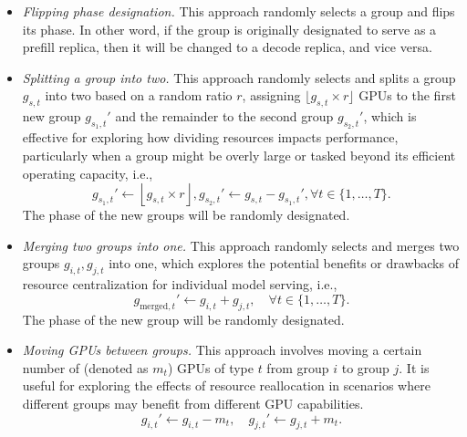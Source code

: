 \begin{itemize}[leftmargin=*,topsep=5pt]
\item \textit{Flipping phase designation.} This approach randomly selects a group and flips its phase. In other word, if the group is originally designated to serve as a prefill replica, then it will be changed to a decode replica, and vice versa. 
% 
\item \textit{Splitting a group into two.} This approach randomly selects and splits a group {\semismall \( g_{s,t} \)} into two based on a random ratio {\semismall \( r \)}, assigning {\semismall \( \lfloor g_{s,t} \times r \rfloor \)} GPUs to the first new group {\semismall \( g_{s_1,t}' \)} and the remainder to the second group {\semismall \( g_{s_2,t}' \)}, which is effective for exploring how dividing resources impacts performance, particularly when a group might be overly large or tasked beyond its efficient operating capacity, i.e.,
\begin{equation*}
g_{s_1,t}' \leftarrow \left\lfloor g_{s,t} \times r \right\rfloor, 
g_{s_2,t}' \leftarrow g_{s,t} - g_{s_1,t}', \forall t \in \{1, \ldots, T\}.
\end{equation*}
% 
The phase of the new groups will be randomly designated.
% 
\item \textit{Merging two groups into one.} This approach randomly selects and merges two groups {\semismall \( g_{i,t}, g_{j,t} \)} into one, which explores the potential benefits or drawbacks of resource centralization for individual model serving, i.e.,
\begin{equation*}
g_{\text{merged},t}' \leftarrow g_{i,t} + g_{j,t}, \quad \forall t \in \{1, \ldots, T\}.
\end{equation*}
% 
The phase of the new group will be randomly designated.
% 
\item \textit{Moving GPUs between groups.} This approach involves moving a certain number of (denoted as {\semismall \( m_t \)}) GPUs of type {\semismall \( t \)} from group {\semismall \( i \)} to group {\semismall \( j \)}. 
It is useful for exploring the effects of resource reallocation in scenarios where different groups may benefit from different GPU capabilities.
\begin{equation*}
g_{i,t}' \leftarrow g_{i,t} - m_t, \quad g_{j,t}' \leftarrow g_{j,t} + m_t.
\end{equation*}
% 
\end{itemize}
